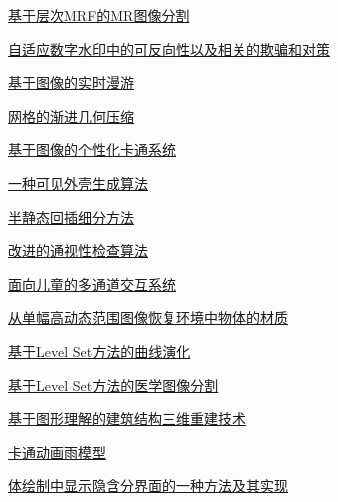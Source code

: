 \documentclass[a4paper]{article}
\begin{document}
\href{http://www.jos.org.cn/ch/reader/download_pdf.aspx?file_no=20020905&year_id=2002&quarter_id=9&falg=1}{基于层次MRF的MR图像分割}

\href{http://www.jos.org.cn/ch/reader/download_pdf.aspx?file_no=20020906&year_id=2002&quarter_id=9&falg=1}{自适应数字水印中的可反向性以及相关的欺骗和对策}

\href{http://www.jos.org.cn/ch/reader/download_pdf.aspx?file_no=20020907&year_id=2002&quarter_id=9&falg=1}{基于图像的实时漫游}

\href{http://www.jos.org.cn/ch/reader/download_pdf.aspx?file_no=20020908&year_id=2002&quarter_id=9&falg=1}{网格的渐进几何压缩}

\href{http://www.jos.org.cn/ch/reader/download_pdf.aspx?file_no=20020909&year_id=2002&quarter_id=9&falg=1}{基于图像的个性化卡通系统}

\href{http://www.jos.org.cn/ch/reader/download_pdf.aspx?file_no=20020910&year_id=2002&quarter_id=9&falg=1}{一种可见外壳生成算法}

\href{http://www.jos.org.cn/ch/reader/download_pdf.aspx?file_no=20020911&year_id=2002&quarter_id=9&falg=1}{半静态回插细分方法}

\href{http://www.jos.org.cn/ch/reader/download_pdf.aspx?file_no=20020912&year_id=2002&quarter_id=9&falg=1}{改进的通视性检查算法}

\href{http://www.jos.org.cn/ch/reader/download_pdf.aspx?file_no=20020913&year_id=2002&quarter_id=9&falg=1}{面向儿童的多通道交互系统}

\href{http://www.jos.org.cn/ch/reader/download_pdf.aspx?file_no=20020914&year_id=2002&quarter_id=9&falg=1}{从单幅高动态范围图像恢复环境中物体的材质}

\href{http://www.jos.org.cn/ch/reader/download_pdf.aspx?file_no=20020915&year_id=2002&quarter_id=9&falg=1}{基于Level Set方法的曲线演化}

\href{http://www.jos.org.cn/ch/reader/download_pdf.aspx?file_no=20020916&year_id=2002&quarter_id=9&falg=1}{基于Level Set方法的医学图像分割}

\href{http://www.jos.org.cn/ch/reader/download_pdf.aspx?file_no=20020917&year_id=2002&quarter_id=9&falg=1}{基于图形理解的建筑结构三维重建技术}

\href{http://www.jos.org.cn/ch/reader/download_pdf.aspx?file_no=20020918&year_id=2002&quarter_id=9&falg=1}{卡通动画雨模型}

\href{http://www.jos.org.cn/ch/reader/download_pdf.aspx?file_no=20020919&year_id=2002&quarter_id=9&falg=1}{体绘制中显示隐含分界面的一种方法及其实现}
\end{document}
